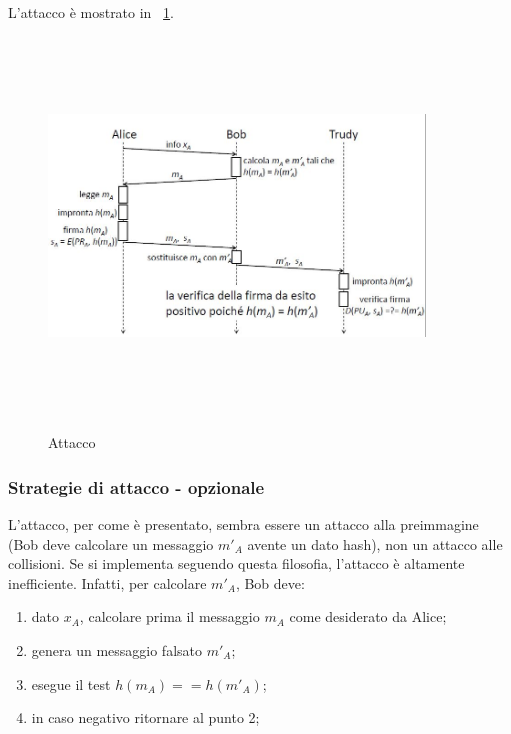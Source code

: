 L'attacco è mostrato in \figurename~\ref{fig:esempio_res_coll_attack}.
\begin{figure}
	\begin{center}
	{\includegraphics[height=10cm, width=10cm, keepaspectratio]{Immagini/hash/schema_hash_collisioni_1.JPG}}
	\caption{Attacco\label{fig:esempio_res_coll_attack}}
	\end{center}
\end{figure}

\subsubsection{Strategie di attacco - opzionale}
L'attacco, per come è presentato, sembra essere un attacco alla preimmagine (Bob deve calcolare un messaggio $m'_{A}$ avente un dato hash), non un attacco alle collisioni. Se si implementa seguendo questa filosofia, l'attacco è altamente inefficiente. Infatti, per calcolare $m'_{A}$, Bob deve:

\begin{enumerate}
\item dato $x_{A}$, calcolare prima il messaggio $m_{A}$ come desiderato da Alice;
\item genera un messaggio falsato $m'_{A}$;
\item esegue il test $h(m_{A}) == h(m'_{A})$;
\item in caso negativo ritornare al punto 2;
\end{enumerate}

